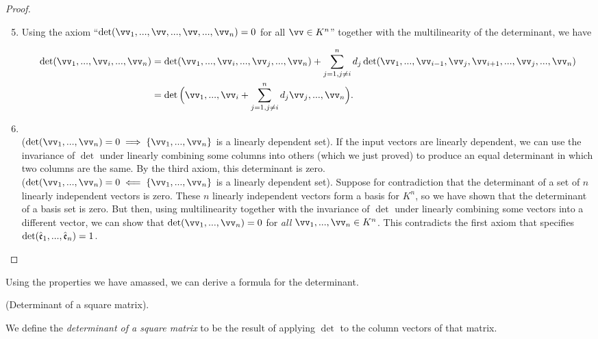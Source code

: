 \begin{proof}
    \mbox{} \\
    \begin{enumerate}
    \setcounter{enumi}{4}
        \item 
        
        Using the axiom ``$\det(\vv_1, ..., \vv, ..., \vv, ..., \vv_n) = 0$ for all $\vv \in K^n$'' together with the multilinearity of the determinant, we have
        
        \begin{align*}
            \det(\vv_1, ..., \vv_i, ..., \vv_n)
            &= \det(\vv_1, ..., \vv_i, ..., \vv_j, ..., \vv_n) + \sum_{j = 1, j \neq i}^n d_j \det(\vv_1, ..., \vv_{i - 1}, \vv_j, \vv_{i + 1}, ..., \vv_j, ..., \vv_n) \\
            &= \det\Big( \vv_1, ..., \vv_i + \sum_{j = 1, j \neq i}^n d_j \vv_j, ..., \vv_n \Big).
        \end{align*}
        
        \item 
        \mbox{}
        \\ \indent ($\det(\vv_1, ..., \vv_n) = 0 \implies \{\vv_1, ..., \vv_n\}$ is a linearly dependent set). If the input vectors are linearly dependent, we can use the invariance of $\det$ under linearly combining some columns into others (which we just proved) to produce an equal determinant in which two columns are the same. By the third axiom, this determinant is zero.
        \\ \indent ($\det(\vv_1, ..., \vv_n) = 0 \impliedby \{\vv_1, ..., \vv_n\}$ is a linearly dependent set). Suppose for contradiction that the determinant of a set of $n$ linearly independent vectors is zero. These $n$ linearly independent vectors form a basis for $K^n$, so we have shown that the determinant of a basis set is zero. But then, using multilinearity together with the invariance of $\det$ under linearly combining some vectors into a different vector, we can show that $\det(\vv_1, ..., \vv_n) = 0$ for \textit{all} $\vv_1, ..., \vv_n \in K^n$. This contradicts the first axiom that specifies $\det(\hat{\mathfrak{e}}_1, ..., \hat{\mathfrak{e}}_n) = 1$.
    \end{enumerate}
\end{proof}

Using the properties we have amassed, we can derive a formula for the determinant.

\begin{defn}
    (Determinant of a square matrix). 
    
    We define the \textit{determinant of a square matrix} to be the result of applying $\det$ to the column vectors of that matrix.
\end{defn}

